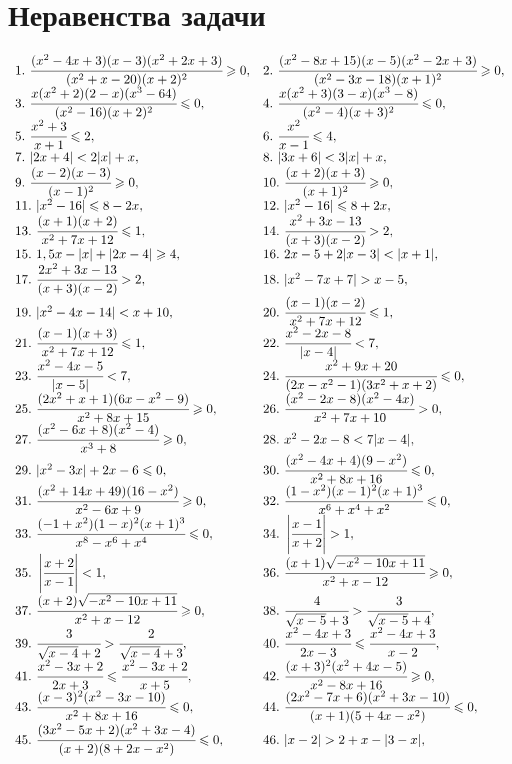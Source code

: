 \documentclass[12pt]{article}
\begin{document}
\section{Неравенства задачи}
$\begin{array}{ll}
1.\ \cfrac{(x^2-4x+3)(x-3)(x^2+2x+3)}{(x^2+x-20)(x+2)^2}\geqslant0,&
2.\ \cfrac{(x^2-8x+15)(x-5)(x^2-2x+3)}{(x^2-3x-18)(x+1)^2}\geqslant0,\\
3.\ \cfrac{x(x^2+2)(2-x)(x^3-64)}{(x^2-16)(x+2)^2}\leqslant 0,&
4.\ \cfrac{x(x^2+3)(3-x)(x^3-8)}{(x^2-4)(x+3)^2}\leqslant 0,\\
5.\ \cfrac{x^2+3}{x+1}\leqslant2,&
6.\ \cfrac{x^2}{x-1}\leqslant4,\\
7.\ |2x+4|<2|x|+x,&
8.\ |3x+6|<3|x|+x,\\
9.\ \cfrac{(x-2)(x-3)}{(x-1)^2}\geqslant0,&
10.\ \cfrac{(x+2)(x+3)}{(x+1)^2}\geqslant0,\\
11.\ |x^2-16|\leqslant8-2x,&
12.\ |x^2-16|\leqslant8+2x,\\
13.\ \cfrac{(x+1)(x+2)}{x^2+7x+12}\leqslant1,&
14.\ \cfrac{x^2+3x-13}{(x+3)(x-2)}>2,\\
15.\ 1,5x-|x|+|2x-4|\geqslant4,&
16.\ 2x-5+2|x-3|<|x+1|,\\
17.\ \cfrac{2x^2+3x-13}{(x+3)(x-2)}>2,&
18.\ |x^2-7x+7|>x-5,\\
19.\ |x^2-4x-14|<x+10,&
20.\ \cfrac{(x-1)(x-2)}{x^2+7x+12}\leqslant1,\\
21.\ \cfrac{(x-1)(x+3)}{x^2+7x+12}\leqslant1,&
22.\ \cfrac{x^2-2x-8}{|x-4|}<7,\\
23.\ \cfrac{x^2-4x-5}{|x-5|}<7,&
24.\ \cfrac{x^2+9x+20}{(2x-x^2-1)(3x^2+x+2)}\leqslant0,\\
25.\ \cfrac{(2x^2+x+1)(6x-x^2-9)}{x^2+8x+15}\geqslant0,&
26.\ \cfrac{(x^2-2x-8)(x^2-4x)}{x^2+7x+10}>0,\\
27.\ \cfrac{(x^2-6x+8)(x^2-4)}{x^3+8}\geqslant0,&
28.\ x^2-2x-8<7|x-4|,\\
29.\ |x^2-3x|+2x-6\leqslant0,&
30.\ \cfrac{(x^2-4x+4)(9-x^2)}{x^2+8x+16}\leqslant0,\\
31.\ \cfrac{(x^2+14x+49)(16-x^2)}{x^2-6x+9}\geqslant0,&
32.\ \cfrac{(1-x^2)(x-1)^2(x+1)^3}{x^6+x^4+x^2}\leqslant0,\\
33.\ \cfrac{(-1+x^2)(1-x)^2(x+1)^3}{x^8-x^6+x^4}\leqslant0,&
34.\ \left|\cfrac{x-1}{x+2}\right|>1,\\
35.\ \left|\cfrac{x+2}{x-1}\right|<1,&
36.\ \cfrac{(x+1)\sqrt{-x^2-10x+11}}{x^2+x-12}\geqslant0,\\
37.\ \cfrac{(x+2)\sqrt{-x^2-10x+11}}{x^2+x-12}\geqslant0,&
38.\ \cfrac{4}{\sqrt{x-5}+3}>\cfrac{3}{\sqrt{x-5}+4},\\
39.\ \cfrac{3}{\sqrt{x-4}+2}>\cfrac{2}{\sqrt{x-4}+3},&
40.\ \cfrac{x^2-4x+3}{2x-3}\leqslant\cfrac{x^2-4x+3}{x-2},\\
41.\ \cfrac{x^2-3x+2}{2x+3}\leqslant\cfrac{x^2-3x+2}{x+5},&
42.\ \cfrac{(x+3)^2(x^2+4x-5)}{x^2-8x+16}\geqslant0,\\
43.\ \cfrac{(x-3)^2(x^2-3x-10)}{x^2+8x+16}\leqslant0,&
44.\ \cfrac{(2x^2-7x+6)(x^2+3x-10)}{(x+1)(5+4x-x^2)}\leqslant0,\\
45.\ \cfrac{(3x^2-5x+2)(x^2+3x-4)}{(x+2)(8+2x-x^2)}\leqslant0,&
46.\ |x-2|>2+x-|3-x|,\end{array}$\\
\end{document}
